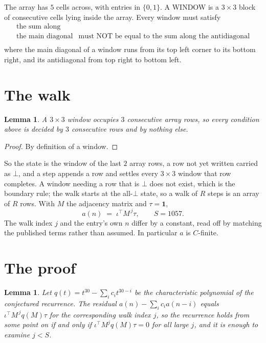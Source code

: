 \documentclass[11pt,a4paper]{article}
\theoremstyle{plain}
\newtheorem{lemma}[theorem]{Lemma}
\theoremstyle{definition}
\begin{document}
The array has $5$ cells across, with entries in $\{0,1\}$. A WINDOW is a $3\times3$ block
of consecutive cells lying inside the array. Every window must satisfy
\[
\begin{array}{ll}
\text{the sum along} & \text{} \\[2pt]
\text{the main diagonal} & \text{must NOT be equal to the sum along the antidiagonal} \\
\end{array}
\]
where the main diagonal of a window runs from its top left corner to its bottom right, and its
antidiagonal from top right to bottom left.

\section{The walk}

\begin{lemma}\label{lem:win}
A $3\times3$ window occupies $3$ consecutive array rows, so every condition above is
decided by $3$ consecutive rows and by nothing else.
\end{lemma}

\begin{proof}
By definition of a window.
\end{proof}

So the state is the window of the last $2$ array rows, a row not yet written carried as
$\bot$, and a step appends a row and settles every $3\times3$ window that row completes. A
window needing a row that is $\bot$ does not exist, which is the boundary rule; the walk starts
at the all-$\bot$ state, so a walk of $R$ steps is an array of $R$ rows. With $M$ the adjacency
matrix and $\tau=\mathbf{1}$,
\[
a(n)\;=\;\iota^{\!\top}M^{\,j}\tau ,\qquad S=1057.
\]
The walk index $j$ and the entry's own $n$ differ by a constant, read off by matching the
published terms rather than assumed. In particular $a$ is $C$-finite.

\section{The proof}

\begin{lemma}\label{lem:crit}
Let $q(t)=t^{30}-\sum_i c_it^{30-i}$ be the characteristic polynomial of the
conjectured recurrence. The residual $a(n)-\sum_ic_ia(n-i)$ equals
$\iota^{\!\top}M^{\,j}q(M)\tau$ for the corresponding walk index $j$, so the recurrence
holds from some point on if and only if $\iota^{\!\top}M^{j}q(M)\tau=0$ for all large $j$,
and it is enough to examine $j<S$.
\end{lemma}
\end{document}
